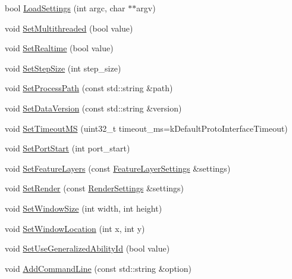 \begin{DoxyCompactItemize}
\item 
bool \hyperlink{classsc2_1_1_coordinator_ada059b9a60d901be047ef33ce612c5d2}{Load\+Settings} (int argc, char $\ast$$\ast$argv)
\item 
void \hyperlink{classsc2_1_1_coordinator_a555587bc85ac437711d15b569c75181a}{Set\+Multithreaded} (bool value)
\item 
void \hyperlink{classsc2_1_1_coordinator_a602e6ead93e360771ce36d6ac782fc2a}{Set\+Realtime} (bool value)
\item 
void \hyperlink{classsc2_1_1_coordinator_a7cea718f571effbe25b771315628c685}{Set\+Step\+Size} (int step\+\_\+size)
\item 
void \hyperlink{classsc2_1_1_coordinator_ad906656238e13a8bab21c46f50aecc3d}{Set\+Process\+Path} (const std\+::string \&path)
\item 
void \hyperlink{classsc2_1_1_coordinator_ac4071b2072ce3120b135c37c7e7587d1}{Set\+Data\+Version} (const std\+::string \&version)
\item 
void \hyperlink{classsc2_1_1_coordinator_aadbfd927d66314a4eb949b2de2ae37b4}{Set\+Timeout\+MS} (uint32\+\_\+t timeout\+\_\+ms=k\+Default\+Proto\+Interface\+Timeout)
\item 
void \hyperlink{classsc2_1_1_coordinator_aaad48921bac2f4f84471de5e9cff75d5}{Set\+Port\+Start} (int port\+\_\+start)
\item 
void \hyperlink{classsc2_1_1_coordinator_ab46aec5712f6ec8ef12b03854f6e0495}{Set\+Feature\+Layers} (const \hyperlink{structsc2_1_1_feature_layer_settings}{Feature\+Layer\+Settings} \&settings)
\item 
void \hyperlink{classsc2_1_1_coordinator_ace8a0630c6b61d28e81c94bbebad3d7d}{Set\+Render} (const \hyperlink{structsc2_1_1_render_settings}{Render\+Settings} \&settings)
\item 
void \hyperlink{classsc2_1_1_coordinator_a9b0eca71a6f7575f35d1dd5c3e5d73cf}{Set\+Window\+Size} (int width, int height)
\item 
void \hyperlink{classsc2_1_1_coordinator_a6e372788e11c3916fdf1982eb2e55511}{Set\+Window\+Location} (int x, int y)
\item 
void \hyperlink{classsc2_1_1_coordinator_a8aedd93ba1d7eb9e81b37b34ff76147c}{Set\+Use\+Generalized\+Ability\+Id} (bool value)
\item 
\mbox{\label{classsc2_1_1_coordinator_aa59950d8ccb9d010288df3e1e6045eb9}} 
void \hyperlink{classsc2_1_1_coordinator_aa59950d8ccb9d010288df3e1e6045eb9}{Add\+Command\+Line} (const std\+::string \&option)
$$
\end{DoxyCompactItemize}
